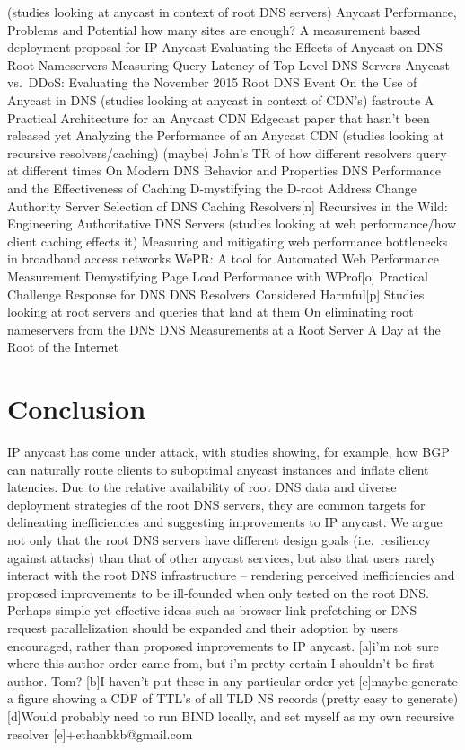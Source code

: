 \documentclass[sigconf,nonacm,10pt]{acmart}
\begin{document}
(studies looking at anycast in context of root DNS servers) Anycast
Performance, Problems and Potential how many sites are enough? A
measurement based deployment proposal for IP Anycast Evaluating the
Effects of Anycast on DNS Root Nameservers Measuring Query Latency of
Top Level DNS Servers Anycast vs.~DDoS: Evaluating the November 2015
Root DNS Event On the Use of Anycast in DNS (studies looking at anycast
in context of CDN's) fastroute A Practical Architecture for an Anycast
CDN Edgecast paper that hasn't been released yet Analyzing the
Performance of an Anycast CDN (studies looking at recursive
resolvers/caching) (maybe) John's TR of how different resolvers query at
different times On Modern DNS Behavior and Properties DNS Performance
and the Effectiveness of Caching D-mystifying the D-root Address Change
Authority Server Selection of DNS Caching Resolvers{[}n{]} Recursives in
the Wild: Engineering Authoritative DNS Servers (studies looking at web
performance/how client caching effects it) Measuring and mitigating web
performance bottlenecks in broadband access networks WePR: A tool for
Automated Web Performance Measurement Demystifying Page Load Performance
with WProf{[}o{]} Practical Challenge Response for DNS DNS Resolvers
Considered Harmful{[}p{]} Studies looking at root servers and queries
that land at them On eliminating root nameservers from the DNS DNS
Measurements at a Root Server A Day at the Root of the Internet

\fi

\section{Conclusion}\label{conclusion-1}

IP anycast has come under attack, with studies showing, for example, how
BGP can naturally route clients to suboptimal anycast instances and
inflate client latencies. Due to the relative availability of root DNS
data and diverse deployment strategies of the root DNS servers, they are
common targets for delineating inefficiencies and suggesting
improvements to IP anycast. We argue not only that the root DNS servers
have different design goals (i.e.~resiliency against attacks) than that
of other anycast services, but also that users rarely interact with the
root DNS infrastructure -- rendering perceived inefficiencies and
proposed improvements to be ill-founded when only tested on the root
DNS. Perhaps simple yet effective ideas such as browser link prefetching
or DNS request parallelization should be expanded and their adoption by
users encouraged, rather than proposed improvements to IP anycast.
{[}a{]}i'm not sure where this author order came from, but i'm pretty
certain I shouldn't be first author. Tom? {[}b{]}I haven't put these in
any particular order yet {[}c{]}maybe generate a figure showing a CDF of
TTL's of all TLD NS records (pretty easy to generate) {[}d{]}Would
probably need to run BIND locally, and set myself as my own recursive
resolver {[}e{]}+ethanbkb@gmail.com
\end{document}

